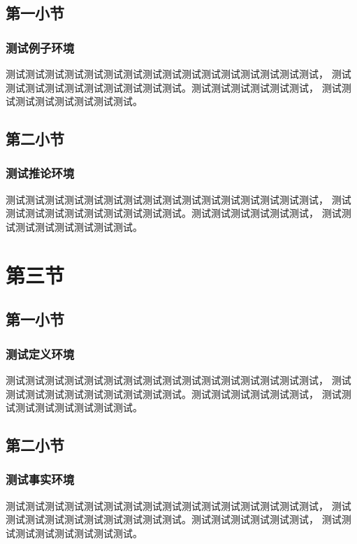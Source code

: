 \documentclass[10pt,serif,t]{beamer}
\begin{document}
\subsection{第一小节}

\begin{frame}
  \frametitle{测试例子环境}
  \begin{example}
    测试测试测试测试测试测试测试测试测试测试测试测试测试测试测试测试，
    测试测试测试测试测试测试测试测试测试测试。测试测试测试测试测试测试，
    测试测试测试测试测试测试测试测试。
  \end{example}
\end{frame}

\subsection{第二小节}

\begin{frame}
  \frametitle{测试推论环境}
  \begin{corollary}
    测试测试测试测试测试测试测试测试测试测试测试测试测试测试测试测试，
    测试测试测试测试测试测试测试测试测试测试。测试测试测试测试测试测试，
    测试测试测试测试测试测试测试测试。
  \end{corollary}
\end{frame}

\section{第三节}

\subsection{第一小节}

\begin{frame}
  \frametitle{测试定义环境}
  \begin{definition}
    测试测试测试测试测试测试测试测试测试测试测试测试测试测试测试测试，
    测试测试测试测试测试测试测试测试测试测试。测试测试测试测试测试测试，
    测试测试测试测试测试测试测试测试。
  \end{definition}
\end{frame}

\subsection{第二小节}

\begin{frame}
  \frametitle{测试事实环境}
  \begin{fact}
    测试测试测试测试测试测试测试测试测试测试测试测试测试测试测试测试，
    测试测试测试测试测试测试测试测试测试测试。测试测试测试测试测试测试，
    测试测试测试测试测试测试测试测试。
  \end{fact}
\end{frame}
\end{document}
